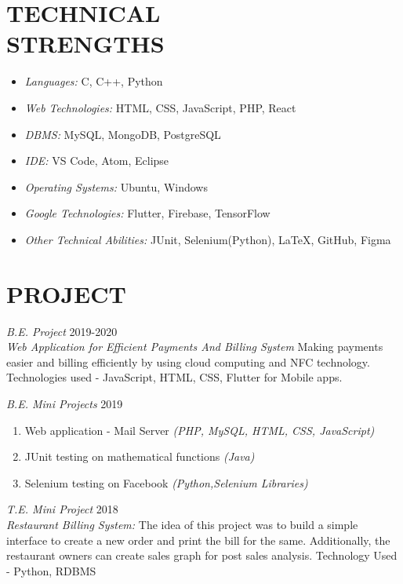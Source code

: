 \documentclass[margin, 12pt]{res} %
\begin{document}
\begin{resume}
\section{TECHNICAL \\ STRENGTHS} 

\begin{itemize}
\item {\sl Languages:} C, C++, Python
\item {\sl Web Technologies:} HTML, CSS, JavaScript, PHP, React
\item {\sl DBMS:} MySQL, MongoDB, PostgreSQL
\item {\sl IDE:} VS Code, Atom, Eclipse
\item {\sl Operating Systems:} Ubuntu, Windows
\item {\sl Google Technologies:} Flutter, Firebase, TensorFlow
\item {\sl Other Technical Abilities:} JUnit, Selenium(Python), LaTeX, GitHub, Figma
\end{itemize}

 
\section{PROJECT}
{\sl B.E. Project} \hfill 2019-2020 \\
{\sl Web Application for Efficient Payments And Billing System }
Making payments easier and billing efficiently by using cloud computing and NFC technology. Technologies used - JavaScript, HTML, CSS, Flutter for Mobile apps.

{\sl B.E. Mini Projects} \hfill 2019
\begin{enumerate}
\item {Web application - Mail Server \sl{(PHP, MySQL, HTML, CSS, JavaScript)}}
\item {JUnit testing on mathematical functions \sl{(Java)}}
\item {Selenium testing on Facebook \sl{(Python,Selenium Libraries)}}
\end{enumerate}

{\sl T.E. Mini Project} \hfill 2018 \\
{\sl Restaurant Billing System:}
The idea of this project was to build a simple interface to create a new order and print the bill for the same. Additionally, the restaurant owners can create sales graph for post sales analysis. Technology Used - Python, RDBMS


\end{resume}
\end{document}
